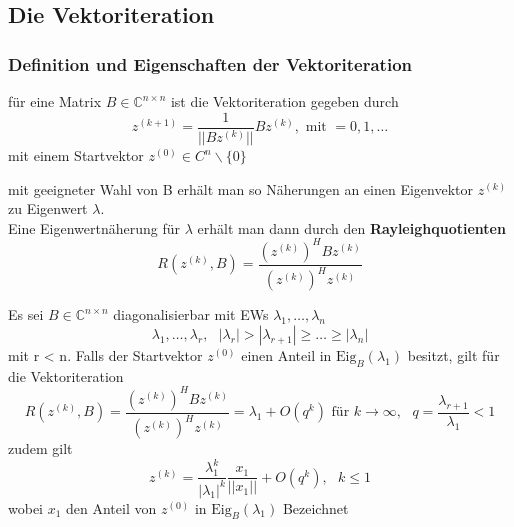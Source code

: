 \documentclass[
	ngerman,
	accentcolor=9c,%
	type=intern,
	marginpar=false
	]{tudapub}
\begin{document}
        \subsection{Die Vektoriteration}
            \subsubsection{Definition und Eigenschaften der Vektoriteration}
                \begin{definition}
                    für eine Matrix $B \in \mathbb{C}^{n \times n}$ ist die Vektoriteration gegeben durch
                    \begin{equation*}
                        z^{(k+1)} = \dfrac{1}{||Bz^{(k)}||}Bz^{(k)}, \mbox{ mit }= 0,1, \dots
                    \end{equation*}
                    mit einem Startvektor $z^{(0)} \in C^n \backslash \{0\}$
                \end{definition}
                mit geeigneter Wahl von B erhält man so Näherungen an einen Eigenvektor $z^{(k)}$ zu Eigenwert $\lambda$.\\
                Eine Eigenwertnäherung für $\lambda$ erhält man dann durch den \textbf{Rayleighquotienten}
                \begin{equation*}
                    R(z^{(k)},B)=\dfrac{(z^{(k)})^HBz^{(k)}}{(z^{(k)})^Hz^{(k)}}
                \end{equation*}
                \begin{satz}
                    Es sei $B \in \mathbb{C}^{n \times n}$ diagonalisierbar mit EWs $\lambda_1,\dots,\lambda_n$
                    \begin{equation}
                        \lambda_1,\dots,\lambda_r, \mbox{ }|\lambda_r| > |\lambda_{r+1}| \geq \dots \geq|\lambda_n|
                    \end{equation}
                    mit r < n. Falls der Startvektor $z^{(0)}$ einen Anteil in $\text{Eig}_B(\lambda_1)$ besitzt, gilt für die Vektoriteration
                    \begin{equation*}
                        R(z^{(k)},B)=\dfrac{(z^{(k)})^HBz^{(k)}}{(z^{(k)})^Hz^{(k)}} = \lambda_1 + O(q^k) \text{ für } k \rightarrow \infty, \mbox{ } q=\dfrac{\lambda_{r+1}}{\lambda_1} < 1
                    \end{equation*}
                    zudem gilt
                    \begin{equation*}
                        z^{(k)} = \dfrac{\lambda_1^k}{|\lambda_1|^k}\dfrac{x_1}{||x_1||} + O(q^k), \mbox{ } k \leq 1
                    \end{equation*}
                    wobei $x_1$ den Anteil von $z^{(0)}$ in $\text{Eig}_B(\lambda_1)$ Bezeichnet
                \end{satz}
\end{document}
